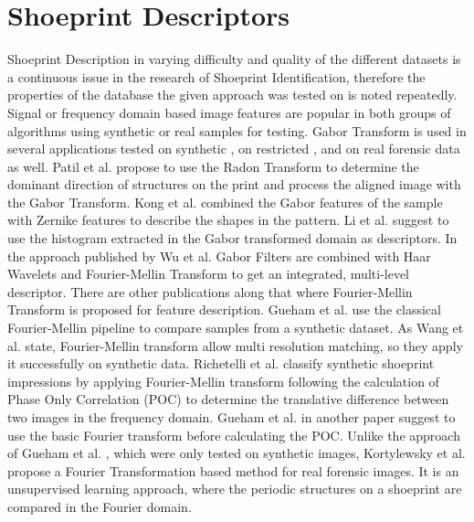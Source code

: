 \documentclass[draft,final]{vutinfth} %
\begin{document}
\section*{Shoeprint Descriptors}
\par
Shoeprint Description  in varying difficulty and quality of the different datasets is a continuous issue in the research of Shoeprint Identification, therefore the properties of the database the given approach was tested on is noted repeatedly.
Signal or frequency domain based image features are popular in both groups of algorithms using synthetic or real samples for testing.
Gabor Transform is used in several applications tested on synthetic \cite{patil2009rotation}, on restricted \cite{kong2014novel}, \cite{li2014retrieval} and on real forensic data \cite{wu2019crime} as well.
Patil et al. \cite{patil2009rotation} propose to use the Radon Transform to determine the dominant direction of structures on the print and process the aligned image with the Gabor Transform.
Kong et al.  \cite{kong2014novel} combined the Gabor features of the sample with Zernike features to describe the shapes in the pattern.
Li et al. \cite{li2014retrieval} suggest to use the histogram extracted in the Gabor transformed domain as descriptors.
In the approach published by Wu et al.  \cite{wu2019crime} Gabor Filters are combined with Haar Wavelets and Fourier-Mellin Transform to get an integrated, multi-level descriptor. 
There are other publications along that where Fourier-Mellin Transform is proposed for feature description.
Gueham et al. \cite{gueham2008automatic} use the classical Fourier-Mellin pipeline to compare samples from a synthetic dataset.
As Wang et al. \cite{wang2014automatic} state, Fourier-Mellin transform allow multi resolution matching, so they apply it successfully on synthetic data.
Richetelli et al. \cite{richetelli2017classification} classify synthetic shoeprint impressions by applying Fourier-Mellin transform following the calculation of Phase Only Correlation (POC) to determine the translative difference between two images in the frequency domain.
Gueham et al. \cite{gueham2007automatic} in another paper suggest to use the basic Fourier transform before calculating the POC.
Unlike the approach of Gueham et al. \cite{gueham2007automatic}, which were only tested on synthetic images, Kortylewsky et al. \cite{kortylewski2014unsupervised} propose a Fourier Transformation based method for real forensic images.
It is an unsupervised learning approach, where the periodic structures on a shoeprint are compared in the Fourier domain.
\end{document}
